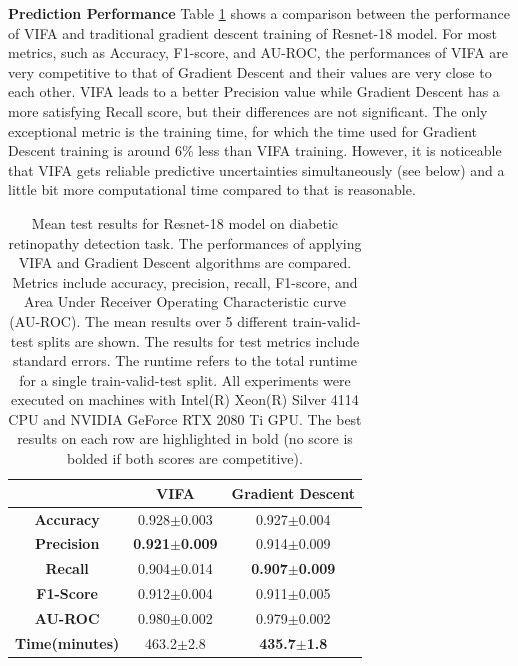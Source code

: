 \documentclass[10pt]{article} %
\begin{document}
\textbf{Prediction Performance}
Table \ref{table: VIFA_GD_comparison} shows a comparison between the performance of VIFA and traditional gradient descent training of Resnet-18 model. For most metrics, such as Accuracy, F1-score, and AU-ROC, the performances of VIFA are very competitive to that of Gradient Descent and their values are very close to each other. VIFA leads to a better Precision value while Gradient Descent has a more satisfying Recall score, but their differences are not significant. The only exceptional metric is the training time, for which the time used for Gradient Descent training is around 6\% less than VIFA training. However, it is noticeable that VIFA gets reliable predictive uncertainties simultaneously (see below) and a little bit more computational time compared to that is reasonable. 

\begin{table}[!htp]
\caption{Mean test results for Resnet-18 model on diabetic retinopathy detection task. The performances of applying VIFA and Gradient Descent algorithms are compared. Metrics include accuracy, precision, recall, F1-score, and Area Under Receiver Operating Characteristic curve (AU-ROC). The mean results over 5 different train-valid-test splits are shown. The results for test metrics include standard errors. The runtime refers to the total runtime for a single train-valid-test split. All experiments were executed on machines with Intel(R) Xeon(R) Silver 4114 CPU and NVIDIA GeForce RTX 2080 Ti GPU. The best results on each row are highlighted in bold (no score is bolded if both scores are competitive).}
\label{table: VIFA_GD_comparison}
\begin{center}
\begin{tabular}{c|c|c}
                   & \textbf{VIFA}        & \textbf{Gradient Descent} \\ \hline
\textbf{Accuracy}  & 0.928$\pm$0.003 & 0.927$\pm$0.004               \\
\textbf{Precision} & \textbf{0.921$\pm$0.009} & 0.914$\pm$0.009               \\
\textbf{Recall}    & 0.904$\pm$0.014 & \textbf{0.907$\pm$0.009}               \\
\textbf{F1-Score}  & 0.912$\pm$0.004 & 0.911$\pm$0.005              \\
\textbf{AU-ROC}    & 0.980$\pm$0.002          & 0.979$\pm$0.002      \\
\textbf{Time(minutes)}      & 463.2$\pm$2.8        & \textbf{435.7$\pm$1.8}   
\end{tabular}
\end{center}
\end{table}
\end{document}
